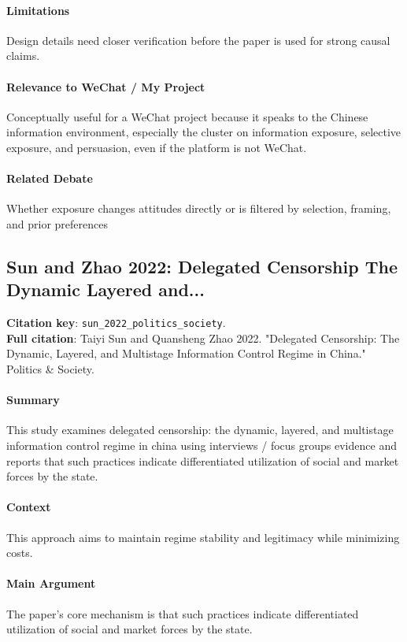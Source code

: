 \documentclass[12pt]{article}
\begin{document}
\paragraph{Limitations} Design details need closer verification before the paper is used for strong causal claims.

\paragraph{Relevance to WeChat / My Project} Conceptually useful for a WeChat project because it speaks to the Chinese information environment, especially the cluster on information exposure, selective exposure, and persuasion, even if the platform is not WeChat.

\paragraph{Related Debate} Whether exposure changes attitudes directly or is filtered by selection, framing, and prior preferences


\subsection{Sun and Zhao 2022: Delegated Censorship The Dynamic Layered and...}
\textbf{Citation key}: \texttt{sun\_2022\_politics\_society}.\\
\textbf{Full citation}: Taiyi Sun and Quansheng Zhao 2022. "Delegated Censorship: The Dynamic, Layered, and Multistage Information Control Regime in China." Politics \& Society.

\paragraph{Summary} This study examines delegated censorship: the dynamic, layered, and multistage information control regime in china using interviews / focus groups evidence and reports that such practices indicate differentiated utilization of social and market forces by the state.

\paragraph{Context} This approach aims to maintain regime stability and legitimacy while minimizing costs.

\paragraph{Main Argument} The paper's core mechanism is that such practices indicate differentiated utilization of social and market forces by the state.
\end{document}
